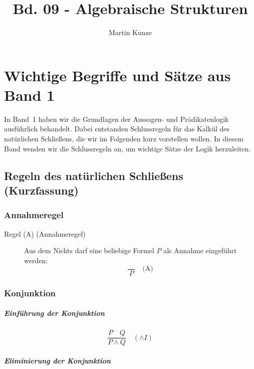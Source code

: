 \documentclass{book}
\title{Bd. 09 - Algebraische Strukturen}
\author{Martin Kunze}
\date{}
\theoremstyle{plain}
\theoremstyle{remark}
\theoremstyle{definition}
\begin{document}
\maketitle
\tableofcontents
\listoftheorems


\chapter{Wichtige Begriffe und Sätze aus Band 1}
\label{sec:band1-essentials}

In Band~1 haben wir die Grundlagen der Aussagen- und Prädikatenlogik ausführlich behandelt. Dabei entstanden Schlussregeln für das Kalkül des natürlichen Schließens, die wir im Folgenden kurz vorstellen wollen. In diesem Band wenden wir die Schlussregeln an, um wichtige Sätze der Logik herzuleiten.

\vspace{1em}

\section{Regeln des natürlichen Schließens (Kurzfassung)}

\subsection{Annahmeregel}
\label{rule:A}

\begin{description}
\item[Regel (\(\mathrm{A}\)) \quad (Annahmeregel)]
  Aus dem Nichts darf eine beliebige Formel \(P\) als Annahme eingeführt werden:
  \[
    \frac{\quad}{P}
    \quad\text{(A)}
  \]
\end{description}

\subsection{Konjunktion}
\label{sec:land-rules}

\paragraph{Einführung der Konjunktion}
\label{rule:AI}

\[
\frac{P \quad Q}{P \land Q}
\quad (\land I)
\]

\paragraph{Eliminierung der Konjunktion}
\label{rule:AE1}\label{rule:AE2}
\end{document}
